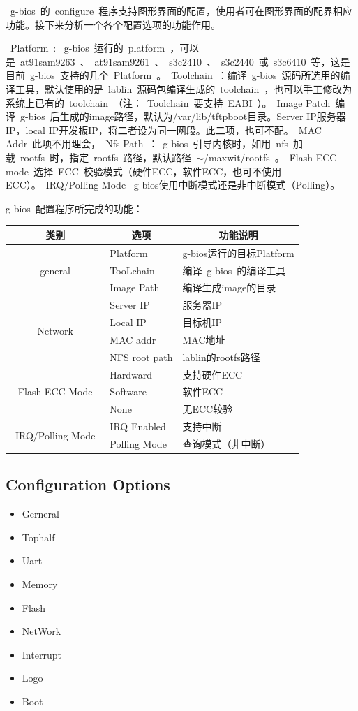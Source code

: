 \documentclass[a4paper,11pt]{book}
\begin{document}
\begin{CJK*}{UTF8}{gbsn}
~g-bios~的~configure~程序支持图形界面的配置，使用者可在图形界面的配界相应功能。接下来分析一个各个配置选项的功能作用。

~Platform~:	~g-bios~运行的~platform~，可以是~at91sam9263~、~at91sam9261~、~s3c2410~、~s3c2440~或~s3c6410~等，这是目前~g-bios~支持的几个~Platform~。~Toolchain~：编译~g-bios~源码所选用的编译工具，默认使用的是~lablin~源码包编译生成的~toolchain~，也可以手工修改为系统上已有的~toolchain~（注：~Toolchain~要支持~EABI~）。~Image Patch~编译~g-bios~后生成的image路径，默认为/var/lib/tftpboot目录。Server IP服务器IP，local IP开发板IP，将二者设为同一网段。此二项，也可不配。~MAC Addr~此项不用理会，~Nfs Path~：~g-bios~引导内核时，如用~nfs~加载~rootfs~时，指定~rootfs~路径，默认路径~$\sim$/maxwit/rootfs~。~Flash ECC mode~选择~ECC~校验模式（硬件ECC，软件ECC，也可不使用ECC）。~IRQ/Polling Mode~ g-bios使用中断模式还是非中断模式（Polling）。

g-bios~配置程序所完成的功能：
\begin{table}[htbp]
\centering
\setlength{\parindent}{0pt}
\begin{tabular}{|c|l|l|}
\hline
类别 & \multicolumn{1}{|c|}{选项} & \multicolumn{1}{|c|}{功能说明} \\ \hline
\multirow{3}{*}{general} & Platform & g-bios运行的目标Platform \\ \cline{2-3}
		& TooLchain & 编译~g-bios~的编译工具 \\ \cline{2-3}
		& Image Path & 编译生成image的目录 \\ \hline
\multirow{4}{*}{Network} & Server IP & 服务器IP \\ \cline{2-3}
		& Local IP & 目标机IP \\ \cline{2-3}
		& MAC addr & MAC地址\\ \cline{2-3}
		& NFS root path &  lablin的rootfs路径\\ \hline
\multirow{3}{*}{~Flash ECC Mode~}   & Hardward & 支持硬件ECC\\ \cline{2-3}
		& Software & 软件ECC\\ \cline{2-3}
		& None & 无ECC较验\\ \cline{2-3}
\multirow{2}{*}{~IRQ/Polling Mode~} & IRQ Enabled & 支持中断 \\ \cline{2-3}
		& Polling Mode & 查询模式（非中断）\\ \hline
\end{tabular}
\end{table}

\subsection{Configuration Options}
\begin{itemize}
\item Gerneral
\item Tophalf
\item Uart
\item Memory
\item Flash
\item NetWork
\item Interrupt
\item Logo
\item Boot
\end{itemize}


\end{CJK*}
\end{document}
